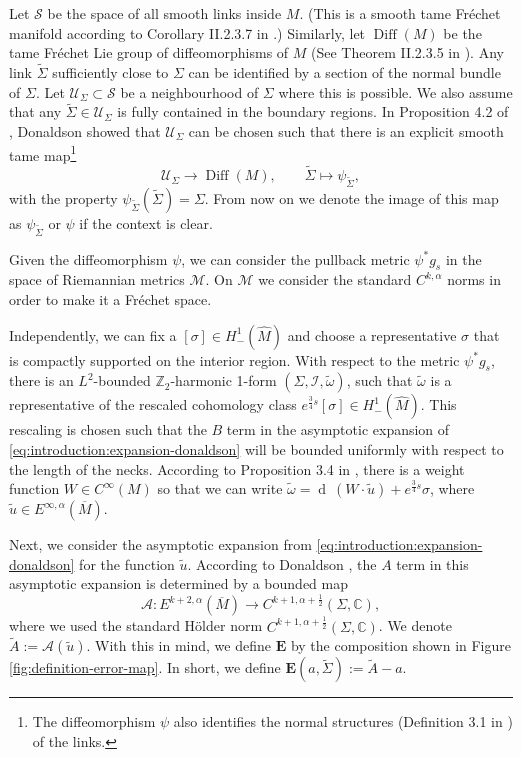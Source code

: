 \documentclass[preprint,12pt]{elsarticle}
\numberwithin{table}{section}
\newcommand{\Z}{\mathbb{Z}}
\newcommand{\C}{\mathbb{C}}
\renewcommand{\d}{\operatorname{d}\!}
\begin{document}
Let $\mathcal{S}$ be the space of all smooth links inside $M$. (This is a smooth tame Fr\'echet manifold according to Corollary II.2.3.7 in \cite{Hamilton1982}.) Similarly, let $\operatorname{Diff}(M)$ be the tame Fr\'echet Lie group of diffeomorphisms of $M$ (See Theorem II.2.3.5 in \cite{Hamilton1982}).
Any link $\tilde \Sigma$ sufficiently close to $\Sigma$ can be identified by a section of the normal bundle of $\Sigma$. Let $\mathcal{U}_\Sigma \subset \mathcal{S}$ be a neighbourhood of $\Sigma$ where this is possible. We also assume that any $\tilde \Sigma \in \mathcal{U}_\Sigma$ is fully contained in the boundary regions.
In Proposition 4.2 of \cite{Donaldson2021}, Donaldson showed that $\mathcal{U}_\Sigma$ can be chosen such that there is an explicit smooth tame map\footnote{The diffeomorphism $\psi$ also identifies the normal structures (Definition 3.1 in \cite{Donaldson2021}) of the links.} 
$$
\mathcal{U}_{\Sigma} \to \operatorname{Diff}(M), \qquad \tilde{\Sigma} \mapsto \psi_{\tilde \Sigma},
$$
with the property $\psi_{\tilde{\Sigma}}(\tilde \Sigma) = \Sigma$. From now on we denote the image of this map as $\psi_{\tilde\Sigma}$ or $\psi$ if the context is clear. 

Given the diffeomorphism $\psi$, we can consider the pullback metric $\psi^* g_s$ in the space of Riemannian metrics $\mathcal{M}$. On $\mathcal{M}$ we consider the standard $C^{k, \alpha}$ norms in order to make it a Fr\'echet space.

Independently, we can fix a $[\sigma] \in H^1_-(\hat{M})$ and choose a representative $\sigma$ that is compactly supported on the interior region. With respect to the metric $\psi^* g_s$, there is an $L^2$-bounded $\Z_2$-harmonic 1-form $(\Sigma, \mathcal{I}, \tilde \omega)$, such that $\tilde \omega$ is a representative of the rescaled cohomology class $ e^{\frac{3}{4}s} [\sigma] \in H^1_-(\hat{M})$. This rescaling is chosen such that the $B$ term in the asymptotic expansion of \cref{eq:introduction:expansion-donaldson} will be bounded uniformly with respect to the length of the necks.
According to Proposition 3.4 in \cite{Donaldson2021}, there is a weight function $W \in C^{\infty}(M)$ so that we can write $\tilde \omega = \d \:(W \cdot \tilde u) + e^{\frac{3}{4}s} \sigma$, where $\tilde u \in E^{\infty, \alpha}(\overline M)$.

Next, we consider the asymptotic expansion from \cref{eq:introduction:expansion-donaldson} for the function $\tilde u$. According to Donaldson \cite{Donaldson2021}, the $A$ term in this asymptotic expansion is determined by a bounded map
\begin{equation}
	\label{eq:A-map-donalson}
\mathcal{A}\colon E^{k+2, \alpha}(\overline{M}) \to C^{k+1, \alpha + \frac{1}{2}}(\Sigma, \C),
\end{equation}
where we used the standard H\"older norm $C^{k+1, \alpha + \frac{1}{2}}(\Sigma, \C)$. We denote $\tilde A := \mathcal{A}(\tilde u)$.
With this in mind, we define $\mathbf{E}$ by the composition shown in Figure \ref{fig:definition-error-map}. In short, we define $\mathbf{E}(a, \tilde \Sigma) := \tilde A - a$.
\end{document}
